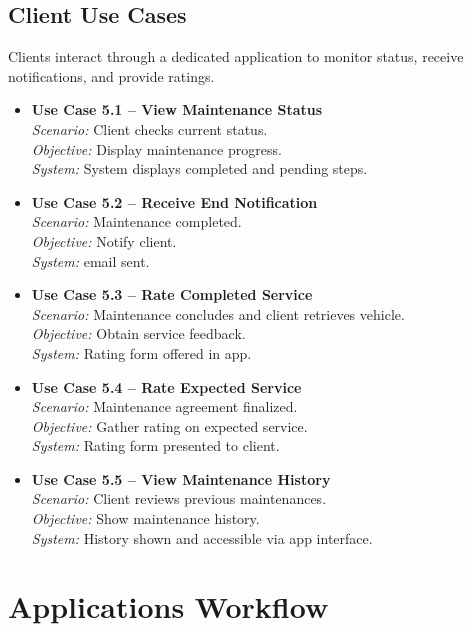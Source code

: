\subsection{Client Use Cases}
Clients interact through a dedicated application to monitor status, receive notifications, and provide ratings.

\begin{itemize}
    \item \textbf{Use Case 5.1 – View Maintenance Status}\\
    \textit{Scenario:} Client checks current status.\\
    \textit{Objective:} Display maintenance progress.\\
    \textit{System:} System displays completed and pending steps.
    \item \textbf{Use Case 5.2 – Receive End Notification}\\
    \textit{Scenario:} Maintenance completed.\\
    \textit{Objective:} Notify client.\\
    \textit{System:} email sent.
    \item \textbf{Use Case 5.3 – Rate Completed Service}\\
    \textit{Scenario:} Maintenance concludes and client retrieves vehicle.\\
    \textit{Objective:} Obtain service feedback.\\
    \textit{System:} Rating form offered in app.
    \item \textbf{Use Case 5.4 – Rate Expected Service}\\
    \textit{Scenario:} Maintenance agreement finalized.\\
    \textit{Objective:} Gather rating on expected service.\\
    \textit{System:} Rating form presented to client.
    \item \textbf{Use Case 5.5 – View Maintenance History}\\
    \textit{Scenario:} Client reviews previous maintenances.\\
    \textit{Objective:} Show maintenance history.\\
    \textit{System:} History shown and accessible via app interface.
\end{itemize}





\section{Applications Workflow}


